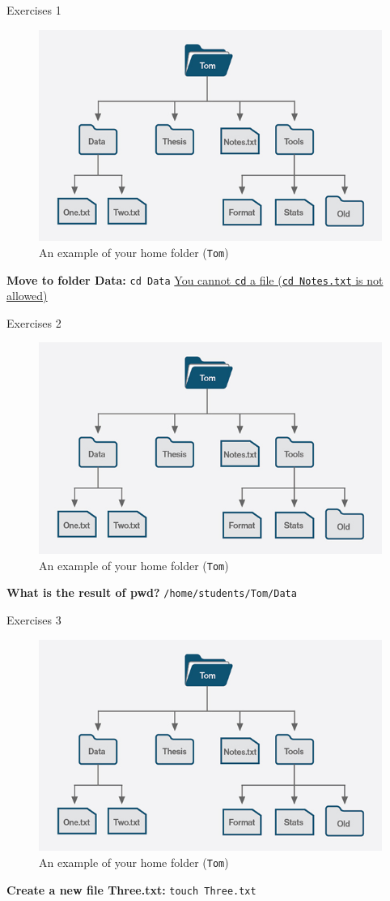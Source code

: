 \documentclass{beamer}
\begin{document}
\begin{frame}{Exercises 1}
\begin{figure}
	\centering
	\includegraphics[width=0.7\linewidth]{00shell}
	\caption{An example of your home folder (\texttt{Tom})}
	\label{fig:00shell}
\end{figure}
\textbf{Move to folder Data:} \pause \texttt{cd Data}
\underline{You cannot \texttt{cd} a file (\texttt{cd Notes.txt} is not allowed)}
\end{frame}

\begin{frame}{Exercises 2}
	\begin{figure}
		\centering
		\includegraphics[width=0.7\linewidth]{00shell}
		\caption{An example of your home folder (\texttt{Tom})}
		\label{fig:00shell}
	\end{figure}
	\textbf{What is the result of pwd?} \pause \texttt{/home/students/Tom/Data}
\end{frame}

\begin{frame}{Exercises 3}
	\begin{figure}
		\centering
		\includegraphics[width=0.7\linewidth]{00shell}
		\caption{An example of your home folder (\texttt{Tom})}
		\label{fig:00shell}
	\end{figure}
	\textbf{Create a new file Three.txt:} \pause \texttt{touch Three.txt}
\end{frame}
\end{document}
